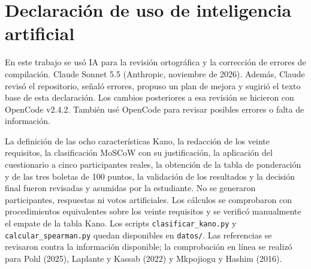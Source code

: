 \documentclass[10pt,a4paper]{article}
\begin{document}
\section{Declaración de uso de inteligencia artificial}
\begin{sloppypar}
En este trabajo se usó IA para la revisión ortográfica y la corrección de errores de compilación. Claude Sonnet 5.5 (Anthropic, noviembre de 2026). Además, Claude revisó el repositorio, señaló errores, propuso un plan de mejora y sugirió el texto base de esta declaración. Los cambios posteriores a esa revisión se hicieron con OpenCode v2.4.2. También usé OpenCode para revisar posibles errores o falta de información.

La definición de las ocho características Kano, la redacción de los veinte requisitos, la clasificación MoSCoW con su justificación, la aplicación del cuestionario a cinco participantes reales, la obtención de la tabla de ponderación y de las tres boletas de 100 puntos, la validación de los resultados y la decisión final fueron revisadas y asumidas por la estudiante. No se generaron participantes, respuestas ni votos artificiales. Los cálculos se comprobaron con procedimientos equivalentes sobre los veinte requisitos y se verificó manualmente el empate de la tabla Kano. Los scripts \texttt{clasificar\_kano.py} y \texttt{calcular\_spearman.py} quedan disponibles en \texttt{datos/}. Las referencias se revisaron contra la información disponible; la comprobación en línea se realizó para Pohl (2025), Laplante y Kassab (2022) y Mkpojiogu y Hashim (2016).
\end{sloppypar}

\vspace*{-0.6cm}

{\footnotesize}
\end{document}
